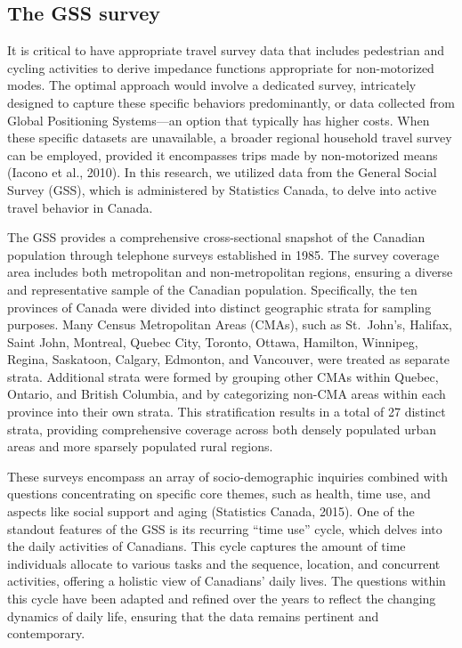 \documentclass[
11pt, %
oneside, %
english, %
singlespacing, %
]{macthesis} %
\begin{document}
\subsection{The GSS survey}\label{the-gss-survey}

It is critical to have appropriate travel survey data that includes pedestrian and cycling activities to derive impedance functions appropriate for non-motorized modes. The optimal approach would involve a dedicated survey, intricately designed to capture these specific behaviors predominantly, or data collected from Global Positioning Systems---an option that typically has higher costs. When these specific datasets are unavailable, a broader regional household travel survey can be employed, provided it encompasses trips made by non-motorized means (Iacono et al., 2010). In this research, we utilized data from the General Social Survey (GSS), which is administered by Statistics Canada, to delve into active travel behavior in Canada.

The GSS provides a comprehensive cross-sectional snapshot of the Canadian population through telephone surveys established in 1985. The survey coverage area includes both metropolitan and non-metropolitan regions, ensuring a diverse and representative sample of the Canadian population. Specifically, the ten provinces of Canada were divided into distinct geographic strata for sampling purposes. Many Census Metropolitan Areas (CMAs), such as St.~John's, Halifax, Saint John, Montreal, Quebec City, Toronto, Ottawa, Hamilton, Winnipeg, Regina, Saskatoon, Calgary, Edmonton, and Vancouver, were treated as separate strata. Additional strata were formed by grouping other CMAs within Quebec, Ontario, and British Columbia, and by categorizing non-CMA areas within each province into their own strata. This stratification results in a total of 27 distinct strata, providing comprehensive coverage across both densely populated urban areas and more sparsely populated rural regions.

These surveys encompass an array of socio-demographic inquiries combined with questions concentrating on specific core themes, such as health, time use, and aspects like social support and aging (Statistics Canada, 2015). One of the standout features of the GSS is its recurring ``time use'' cycle, which delves into the daily activities of Canadians. This cycle captures the amount of time individuals allocate to various tasks and the sequence, location, and concurrent activities, offering a holistic view of Canadians' daily lives. The questions within this cycle have been adapted and refined over the years to reflect the changing dynamics of daily life, ensuring that the data remains pertinent and contemporary.
\end{document}
